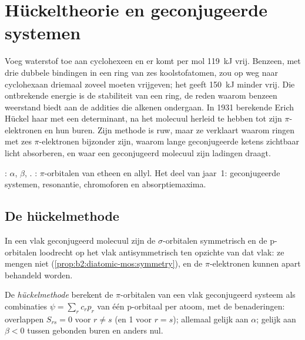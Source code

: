 \chapter{Hückeltheorie en geconjugeerde systemen}\label{ch:b2:huckel}

Voeg waterstof toe aan cyclohexeen en er komt per mol \qty{119}{kJ} vrij. Benzeen,
met drie dubbele bindingen in een ring van zes koolstofatomen, zou op weg naar cyclohexaan driemaal
zoveel moeten vrijgeven; het geeft \qty{150}{kJ} minder vrij. Die ontbrekende
energie is de stabiliteit van een  ring, de reden waarom benzeen weerstand biedt aan
de addities die alkenen ondergaan. In 1931 berekende Erich Hückel haar met een
determinant, na het molecuul herleid te hebben tot zijn $\pi$-elektronen en hun
buren. Zijn methode is ruw, maar ze verklaart waarom ringen met zes $\pi$-elektronen
bijzonder zijn, waarom lange geconjugeerde ketens zichtbaar licht absorberen, en
waar een geconjugeerd molecuul zijn ladingen draagt.

\begin{recall}
:  $\alpha$,  $\beta$,
. : $\pi$-orbitalen van etheen en
allyl. Het deel van jaar~1: geconjugeerde systemen, resonantie, chromoforen en
absorptiemaxima.
\end{recall}

\section{De hückelmethode}

In een vlak geconjugeerd molecuul zijn de $\sigma$-orbitalen symmetrisch en de p-orbitalen
loodrecht op het vlak antisymmetrisch ten opzichte van dat vlak: ze
mengen niet (\cref{prop:b2:diatomic-mos:symmetry}), en de $\pi$-elektronen kunnen
apart behandeld worden.

\begin{definition}[Hückelmethode]\label{def:b2:huckel:method}
De \emph{hückelmethode} berekent de $\pi$-orbitalen van een
vlak geconjugeerd systeem als combinaties $\psi = \sum_r c_r p_r$ van één p-orbitaal per
atoom, met de benaderingen: overlappen $S_{rs} = 0$ voor $r \neq s$ (en 1 voor $r =
s$);  allemaal gelijk aan $\alpha$;  gelijk aan $\beta < 0$
tussen gebonden buren en anders nul.
\end{definition}

